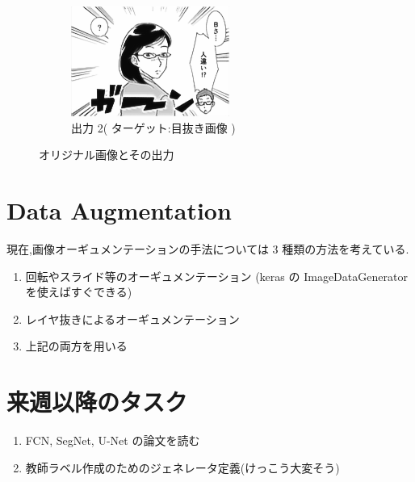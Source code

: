 \documentclass[onecolumn]{ujarticle}     %
\begin{document}
\begin{figure}[h]
\begin{subfigure}{0.49\columnwidth}
			\includegraphics[width=1.2\columnwidth]{rem_eye_10.png}
			\caption{出力 2( ターゲット:目抜き画像 )}
			\label{fig:rem_eye}
		\end{subfigure}
		\caption{オリジナル画像とその出力}
		\label{fig:input_and_output}
	\end{figure}
	
	\section{Data Augmentation}
	現在,画像オーギュメンテーションの手法については 3 種類の方法を考えている.
	\begin{enumerate}
		\item 回転やスライド等のオーギュメンテーション (keras の ImageDataGenerator を使えばすぐできる)
		\item レイヤ抜きによるオーギュメンテーション
		\item 上記の両方を用いる
	\end{enumerate}

	\section{来週以降のタスク}
	\begin{enumerate}
		\item FCN, SegNet, U-Net の論文を読む
		\item 教師ラベル作成のためのジェネレータ定義(けっこう大変そう)
	\end{enumerate}
	
	
	
\end{document}
